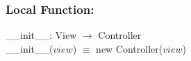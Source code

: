 \documentclass[12pt]{article}
\begin{document}
\subsubsection*{Local Function:}

\_\_init\_\_: View $\rightarrow$ Controller \\
\_\_init\_\_($view$) $\equiv$ new Controller($view$) \\






\end{document}

